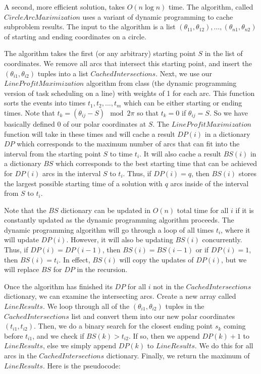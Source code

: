 \documentclass[psamsfonts]{amsart}
\newenvironment{sol}{{\bfseries Solution}}{\qedsymbol}
\theoremstyle{definition}
\theoremstyle{remark}
\numberwithin{equation}{section}
\begin{document}
\begin{sol}
A second, more efficient solution, takes $O(n \log n)$ time. The algorithm, called $CircleArcMaximization$ uses a variant of dynamic programming to cache subproblem results. The input to the algorithm is a list $(\theta_{11}, \theta_{12}), \ldots, (\theta_{n1}, \theta_{n2})$ of starting and ending coordinates on a circle. 

The algorithm takes the first (or any arbitrary) starting point $S$ in the list of coordinates. We remove all arcs that intersect this starting point, and insert the $(\theta_{i1}, \theta_{i2})$ tuples into a list $CachedIntersections$. Next, we use our $LineProfitMaximization$ algorithm from class (the dynamic programming version of task scheduling on a line) with weights of 1 for each arc. This function sorts the events into times $t_1, t_2, \ldots, t_m$ which can be either starting or ending times. Note that $t_k = (\theta_{ij} - S )\mod 2 \pi$ so that $t_k = 0$ if $\theta_{ij} = S$. So we have basically defined 0 of our polar coordinates at $S$. The $LineProfitMaximization$ function will take in these times and will cache a result $DP(i)$ in a dictionary $DP$ which corresponds to the maximum number of arcs that can fit into the interval from the starting point $S$ to time $t_i$. It will also cache a result $BS(i)$ in a dictionary $BS$ which corresponds to the best starting time that can be achieved for $DP(i)$ arcs in the interval $S$ to $t_i$. Thus, if $DP(i) = q$, then $BS(i)$ stores the largest possible starting time of a solution with $q$ arcs inside of the interval from $S$ to $t_i$.  

Note that the $BS$ dictionary can be updated in $O(n)$ total time for all $i$ if it is constantly updated as the dynamic programming algorithm proceeds. The dynamic programming algorithm will go through a loop of all times $t_i$, where it will update $DP(i)$. However, it will also be updating $BS(i)$ concurrently. Thus, if $DP(i) = DP(i-1)$, then $BS(i) = BS(i-1)$ or if $DP(i) = 1$, then $BS(i) = t_i$. In effect, $BS(i)$ will copy the updates of $DP(i)$, but we will replace $BS$ for $DP$ in the recursion.

Once the algorithm has finished its $DP$ for all $i$ not in the $CachedIntersections$ dictionary, we can examine the intersecting arcs. Create a new array called $LineResults$. We loop through all of the $(\theta_{i1}, \theta_{i2})$ tuples in the $CachedIntersections$ list and convert them into our new polar coordinates $(t_{i1}, t_{i2})$. Then, we do a binary search for the closest ending point $s_{k}$ coming before $t_{i1}$, and we check if $BS(k) > t_{i2}$. If so, then we append $DP(k) + 1$ to $LineResults$, else we simply append $DP(k)$ to $LineResults$. We do this for all arcs in the $CachedIntersections$ dictionary. Finally, we return the maximum of $LineResults$. Here is the pseudocode:


\end{sol}
\end{document}
